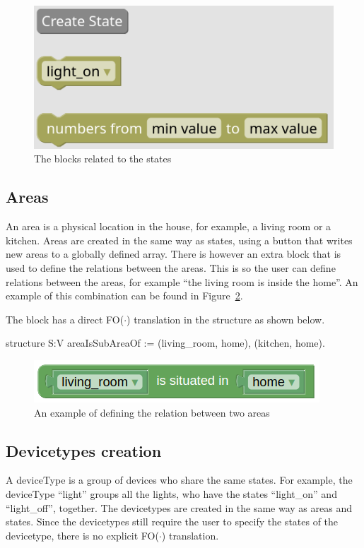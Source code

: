 \documentclass[11pt,a4paper]{report}
\newcommand{\fodot}{FO($\cdot$)\xspace}
\begin{document}
\begin{figure}
    \centering
    \includegraphics[width=0.4\linewidth]{images/homy_state_blocks.png}
    \caption{The blocks related to the states}
    \label{fig:homy_state_blocks}
\end{figure}

\subsection{Areas}
An area is a physical location in the house, for example, a living room or a kitchen. Areas are created in the same way as states, using a button that writes new areas to a globally defined array. There is however an extra block that is used to define the relations between the areas. This is so the user can define relations between the areas, for example ``the living room is inside the home''. An example of this combination can be found in Figure~\ref{fig:homy_area_relation}.

The block has a direct \fodot translation in the structure as shown below. 
\begin{idplisting}
structure S:V {
    areaIsSubAreaOf := {(living_room, home), (kitchen, home)}.
}
\end{idplisting}

\begin{figure}
    \centering
    \includegraphics[width=0.4\linewidth]{images/homy_area_relation.png}
    \caption{An example of defining the relation between two areas}
    \label{fig:homy_area_relation}
\end{figure}

\subsection{Devicetypes creation}
A deviceType is a group of devices who share the same states. For example, the deviceType ``light'' groups all the lights, who have the states ``light\_on'' and ``light\_off'', together. The devicetypes are created in the same way as areas and states. Since the devicetypes still require the user to specify the states of the devicetype, there is no explicit \fodot translation.
\end{document}
